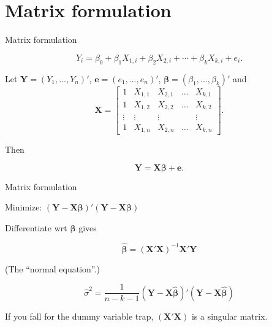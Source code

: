 \documentclass[14pt]{beamer}
\begin{document}
\section{Matrix formulation}

\begin{frame}{Matrix formulation}

\begin{block}{}\vspace*{-0.75cm}
$$Y_i = \beta_0 + \beta_1 X_{1,i} + \beta_2 X_{2,i} + \cdots + \beta_kX_{k,i} + e_i.$$
\end{block}\pause

Let $\bm{Y} = (Y_1,\dots,Y_n)'$, $\bm{e} = (e_1,\dots,e_n)'$, $\bm{\beta} = (\beta_1,\dots,\beta_k)'$ and
\[
\bm{X} = \begin{bmatrix}
  1 & X_{1,1} & X_{2,1} & \dots & X_{k,1}\\
  1 & X_{1,2} & X_{2,2} & \dots & X_{k,2}\\
\vdots & \vdots & \vdots & & \vdots\\
  1 & X_{1,n} & X_{2,n} & \dots & X_{k,n}
  \end{bmatrix}.
\]\pause

Then
\begin{block}{}\vspace*{-0.35cm}
$$\bm{Y} = \bm{X}\bm{\beta} + \bm{e}.$$
\end{block}
\end{frame}

\begin{frame}{Matrix formulation}


Minimize: $(\bm{Y} - \bm{X}\bm{\beta})'(\bm{Y} - \bm{X}\bm{\beta})$\pause
\vspace*{0.5cm}

Differentiate wrt $\bm{\beta}$ gives

\begin{block}{}\vspace*{-0.2cm}
\[
\hat{\bm{\beta}} = (\bm{X}'\bm{X})^{-1}\bm{X}'\bm{Y}
\]
\end{block}
\pause
(The ``normal equation''.)\pause

\[
\hat{\sigma}^2 = \frac{1}{n-k-1}(\bm{Y} - \bm{X}\hat{\bm{\beta}})'(\bm{Y} - \bm{X}\hat{\bm{\beta}})
\]
\vspace*{.2cm}

 If you fall for the dummy variable trap, $(\bm{X}'\bm{X})$ is a singular matrix.
\end{frame}
\end{document}

